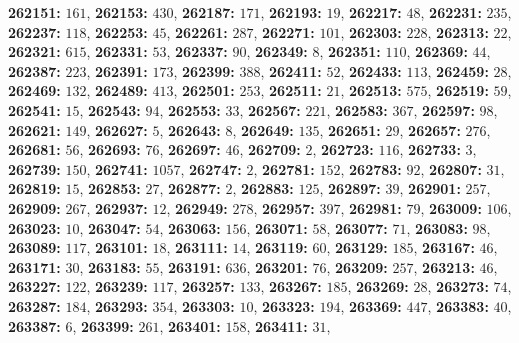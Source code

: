 \textsf{\bfseries 262151:} $161$, \textsf{\bfseries 262153:} $430$, \textsf{\bfseries 262187:} $171$, \textsf{\bfseries 262193:} $19$, \textsf{\bfseries 262217:} $48$, \textsf{\bfseries 262231:} $235$, \textsf{\bfseries 262237:} $118$, \textsf{\bfseries 262253:} $45$, \textsf{\bfseries 262261:} $287$, \textsf{\bfseries 262271:} $101$, \textsf{\bfseries 262303:} $228$, \textsf{\bfseries 262313:} $22$, \textsf{\bfseries 262321:} $615$, \textsf{\bfseries 262331:} $53$, \textsf{\bfseries 262337:} $90$, \textsf{\bfseries 262349:} $8$, \textsf{\bfseries 262351:} $110$, \textsf{\bfseries 262369:} $44$, \textsf{\bfseries 262387:} $223$, \textsf{\bfseries 262391:} $173$, \textsf{\bfseries 262399:} $388$, \textsf{\bfseries 262411:} $52$, \textsf{\bfseries 262433:} $113$, \textsf{\bfseries 262459:} $28$, \textsf{\bfseries 262469:} $132$, \textsf{\bfseries 262489:} $413$, \textsf{\bfseries 262501:} $253$, \textsf{\bfseries 262511:} $21$, \textsf{\bfseries 262513:} $575$, \textsf{\bfseries 262519:} $59$, \textsf{\bfseries 262541:} $15$, \textsf{\bfseries 262543:} $94$, \textsf{\bfseries 262553:} $33$, \textsf{\bfseries 262567:} $221$, \textsf{\bfseries 262583:} $367$, \textsf{\bfseries 262597:} $98$, \textsf{\bfseries 262621:} $149$, \textsf{\bfseries 262627:} $5$, \textsf{\bfseries 262643:} $8$, \textsf{\bfseries 262649:} $135$, \textsf{\bfseries 262651:} $29$, \textsf{\bfseries 262657:} $276$, \textsf{\bfseries 262681:} $56$, \textsf{\bfseries 262693:} $76$, \textsf{\bfseries 262697:} $46$, \textsf{\bfseries 262709:} $2$, \textsf{\bfseries 262723:} $116$, \textsf{\bfseries 262733:} $3$, \textsf{\bfseries 262739:} $150$, \textsf{\bfseries 262741:} $1057$, \textsf{\bfseries 262747:} $2$, \textsf{\bfseries 262781:} $152$, \textsf{\bfseries 262783:} $92$, \textsf{\bfseries 262807:} $31$, \textsf{\bfseries 262819:} $15$, \textsf{\bfseries 262853:} $27$, \textsf{\bfseries 262877:} $2$, \textsf{\bfseries 262883:} $125$, \textsf{\bfseries 262897:} $39$, \textsf{\bfseries 262901:} $257$, \textsf{\bfseries 262909:} $267$, \textsf{\bfseries 262937:} $12$, \textsf{\bfseries 262949:} $278$, \textsf{\bfseries 262957:} $397$, \textsf{\bfseries 262981:} $79$, \textsf{\bfseries 263009:} $106$, \textsf{\bfseries 263023:} $10$, \textsf{\bfseries 263047:} $54$, \textsf{\bfseries 263063:} $156$, \textsf{\bfseries 263071:} $58$, \textsf{\bfseries 263077:} $71$, \textsf{\bfseries 263083:} $98$, \textsf{\bfseries 263089:} $117$, \textsf{\bfseries 263101:} $18$, \textsf{\bfseries 263111:} $14$, \textsf{\bfseries 263119:} $60$, \textsf{\bfseries 263129:} $185$, \textsf{\bfseries 263167:} $46$, \textsf{\bfseries 263171:} $30$, \textsf{\bfseries 263183:} $55$, \textsf{\bfseries 263191:} $636$, \textsf{\bfseries 263201:} $76$, \textsf{\bfseries 263209:} $257$, \textsf{\bfseries 263213:} $46$, \textsf{\bfseries 263227:} $122$, \textsf{\bfseries 263239:} $117$, \textsf{\bfseries 263257:} $133$, \textsf{\bfseries 263267:} $185$, \textsf{\bfseries 263269:} $28$, \textsf{\bfseries 263273:} $74$, \textsf{\bfseries 263287:} $184$, \textsf{\bfseries 263293:} $354$, \textsf{\bfseries 263303:} $10$, \textsf{\bfseries 263323:} $194$, \textsf{\bfseries 263369:} $447$, \textsf{\bfseries 263383:} $40$, \textsf{\bfseries 263387:} $6$, \textsf{\bfseries 263399:} $261$, \textsf{\bfseries 263401:} $158$, \textsf{\bfseries 263411:} $31$, 
